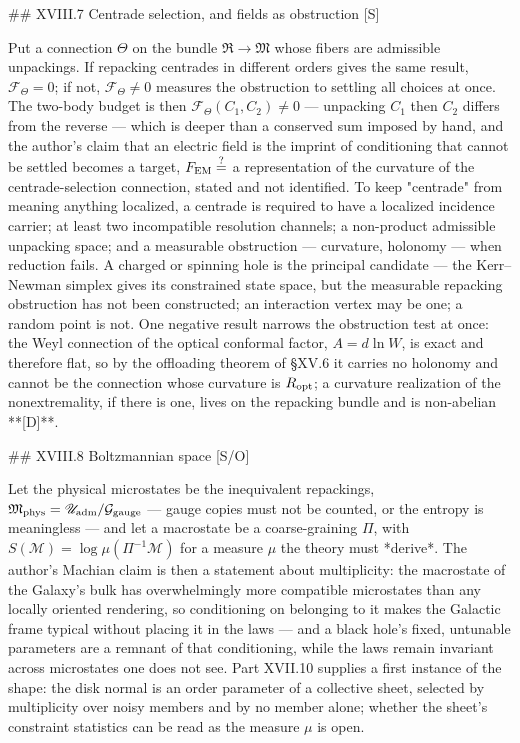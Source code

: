 ## XVIII.7 Centrade selection, and fields as obstruction [S]

Put a connection $\Theta$ on the bundle $\mathfrak R\to\mathfrak M$ whose fibers are admissible unpackings. If repacking centrades in different orders gives the same result, $\mathcal F_\Theta = 0$; if not, $\mathcal F_\Theta\neq0$ measures the obstruction to settling all choices at once. The two-body budget is then $\mathcal F_\Theta(C_1,C_2)\neq0$ — unpacking $C_1$ then $C_2$ differs from the reverse — which is deeper than a conserved sum imposed by hand, and the author's claim that an electric field is the imprint of conditioning that cannot be settled becomes a target, $F_{\rm EM}\overset{?}{=}$ a representation of the curvature of the centrade-selection connection, stated and not identified. To keep "centrade" from meaning anything localized, a centrade is required to have a localized incidence carrier; at least two incompatible resolution channels; a non-product admissible unpacking space; and a measurable obstruction — curvature, holonomy — when reduction fails. A charged or spinning hole is the principal candidate — the Kerr–Newman simplex gives its constrained state space, but the measurable repacking obstruction has not been constructed; an interaction vertex may be one; a random point is not. One negative result narrows the obstruction test at once: the Weyl connection of the optical conformal factor, $A = d\ln W$, is exact and therefore flat, so by the offloading theorem of §XV.6 it carries no holonomy and cannot be the connection whose curvature is $R_{\rm opt}$; a curvature realization of the nonextremality, if there is one, lives on the repacking bundle and is non-abelian **[D]**.

## XVIII.8 Boltzmannian space [S/O]

Let the physical microstates be the inequivalent repackings, $\mathfrak M_{\rm phys} = \mathscr U_{\rm adm}/\mathcal G_{\rm gauge}$ — gauge copies must not be counted, or the entropy is meaningless — and let a macrostate be a coarse-graining $\Pi$, with $S(\mathcal M) = \log\mu(\Pi^{-1}\mathcal M)$ for a measure $\mu$ the theory must *derive*. The author's Machian claim is then a statement about multiplicity: the macrostate of the Galaxy's bulk has overwhelmingly more compatible microstates than any locally oriented rendering, so conditioning on belonging to it makes the Galactic frame typical without placing it in the laws — and a black hole's fixed, untunable parameters are a remnant of that conditioning, while the laws remain invariant across microstates one does not see. Part XVII.10 supplies a first instance of the shape: the disk normal is an order parameter of a collective sheet, selected by multiplicity over noisy members and by no member alone; whether the sheet's constraint statistics can be read as the measure $\mu$ is open.

